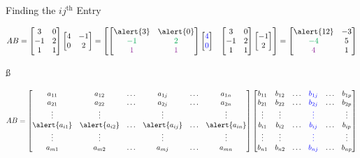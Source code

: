 \documentclass[xcolor=dvipsnames,aspectratio=169,t]{beamer}
\begin{document}
\begin{frame}{Finding the $ij^{\mbox{th}}$ Entry}

\[ AB = \begin{bmatrix} 3 & 0 \\ -1 & 2 \\ 1 & 1 \end{bmatrix} \begin{bmatrix} 4 & -1 \\ 0 & 2 \end{bmatrix} = 
\begin{bmatrix} \begin{bmatrix} \alert{3} & \alert{0} \\ \colorg{-1} & \colorg{2} \\ \colorp{1} & \colorp{1} \end{bmatrix}  \begin{bmatrix} \colorb{4}\\ \colorb{0} \end{bmatrix}  & \begin{bmatrix} 3 & 0 \\ -1 & 2 \\ 1 & 1 \end{bmatrix}  \begin{bmatrix} -1\\2 \end{bmatrix}  \end{bmatrix}
=
\begin{bmatrix} \alert{12} & -3 \\ \colorg{-4} & 5\\ \colorp{4} & 1\end{bmatrix} \]

\ss

{\small
\[ AB = \begin{bmatrix} a_{11} & a_{12} & \ldots & a_{1j} & \ldots & a_{1n} \\
a_{21} & a_{22} & \ldots & a_{2j} & \ldots & a_{2n} \\
\vdots & \vdots & & \vdots & & \vdots \\
\alert{a_{i1}} & \alert{a_{i2}} & \ldots & \alert{a_{ij}} & \ldots & \alert{a_{in}} \\
\vdots & \vdots & & \vdots & & \vdots \\
a_{m1} & a_{m2} & \ldots & a_{mj} & \ldots & a_{mn} 
\end{bmatrix} 
\begin{bmatrix} b_{11} & b_{12} & \ldots & \colorb{b_{1j}} & \ldots & b_{1p} \\
b_{21} & b_{22} & \ldots & \colorb{b_{2j}} & \ldots & b_{2p} \\
\vdots & \vdots & & \colorb{\vdots} & & \vdots \\
b_{i1} & b_{i2} & \ldots & \colorb{b_{ij}} & \ldots & b_{ip} \\
\vdots & \vdots & & \colorb{\vdots} && \vdots \\
b_{n1} & b_{n2} & \ldots & \colorb{b_{nj}} & \ldots & b_{np} 
\end{bmatrix}  \] }



\end{frame}
\end{document}
